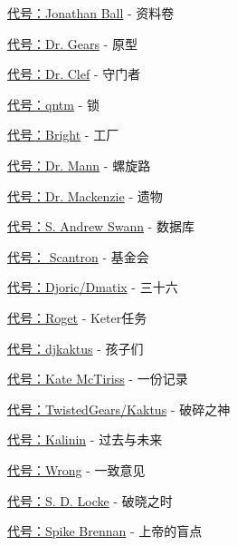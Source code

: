 
\hr

\begin{scpboxbrc}

\hyperref[chap:SCP-001.sheaf.of.papers]{代号：Jonathan Ball} - 资料卷

\hyperref[chap:SCP-001.the.prototype]{代号：Dr. Gears} - 原型

\hyperref[chap:SCP-001.the.gate.guardian]{代号：Dr. Clef} - 守门者

\hyperref[chap:SCP-001.the.lock]{代号：qntm} - 锁

\hyperref[chap:SCP-001.the.factory]{代号：Bright} - 工厂

\hyperref[chap:SCP-001.the.spiral.path]{代号：Dr. Mann} - 螺旋路

\hyperref[chap:SCP-001.the.legacy]{代号：Dr. Mackenzie} - 遗物

\hyperref[chap:SCP-001.the.database]{代号：S. Andrew Swann} - 数据库

\hyperref[chap:SCP-001.the.foundation]{代号： Scantron} - 基金会

\hyperref[chap:SCP-001.thirty.six]{代号：Djoric/Dmatix} - 三十六

\hyperref[chap:SCP-001.keter.duty]{代号：Roget} - Keter任务

\hyperref[chap:SCP-001.the.children]{代号：djkaktus} - 孩子们

\hyperref[chap:SCP-001.a.record]{代号：Kate McTiriss} - 一份记录

\hyperref[chap:SCP-001.the.broken.god]{代号：TwistedGears/Kaktus} - 破碎之神

\hyperref[chap:SCP-001.past.and.future]{代号：Kalinin} - 过去与未来

\hyperref[chap:SCP-001.the.consensus]{代号：Wrong} - 一致意见

\hyperref[chap:SCP-001.when.day.breaks]{代号：S. D. Locke} - 破晓之时

\hyperref[chap:SCP-001.gods.blind.spot]{代号：Spike Brennan} - 上帝的盲点

\end{scpboxbrc}
